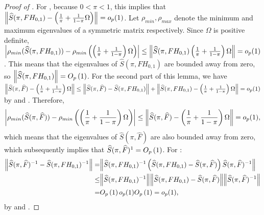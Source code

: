 \documentclass[12pt]{article}
\theoremstyle{plain}
\numberwithin{equation}{section}
\begin{document}
\begin{proof}[Proof of ]
For , because $0 \lt \pi \lt 1$, this implies that \\ $\norm{\widehat{S}(\pi, F H_{0, 1}) - \left( \frac{1}{\pi} + \frac{1}{1 - \pi} \Omega \right) } = o_p(1)$. Let $\rho_{min}, \rho_{max}$ denote the minimum and maximum eigenvalues of a symmetric matrix respectively. Since $\Omega$ is positive definite, \\
$\abs{\rho_{min}(\widehat{S}(\pi, FH_{0, 1})) - \rho_{min} \left( \left( \frac{1}{\pi} + \frac{1}{1 - \pi} \right) \Omega \right)} \leq \norm{\widehat{S}(\pi, F H_{0,1}) \left( \frac{1}{\pi} + \frac{1}{1 - \pi} \right) \Omega } = o_p(1)$. This means that the eigenvalues of $\widehat{S}(\pi, F H_{0, 1})$ are bounded away from zero, so $\norm{\widehat{S}(\pi, F H_{0, 1})} = O_p \left( 1 \right)$. For the second part of this lemma, we have \\
$\norm{\widehat{S}(\pi, \widehat{F}) - \left( \frac{1}{\pi} + \frac{1}{1 - \pi} \right)\Omega } \leq \norm{\widehat{S}(\pi, \widehat{F}) - \widehat{S}(\pi, F H_{0, 1})} + \norm{\widehat{S}(\pi, F H_{0, 1}) - \left( \frac{1}{\pi} + \frac{1}{1 - \pi} \right) \Omega} = o_p(1)$ by  and . Therefore, 
\begin{align*}
\abs{
	\rho_{min}(\widehat{S}(\pi, \widehat{F})) 
	- \rho_{min} \left( \left( \frac{1}{\pi} + \frac{1}{1 - \pi} \right) \Omega \right)
}
\leq 
\norm{
	\widehat{S}(\pi, \widehat{F}) - \left( \frac{1}{\pi} + \frac{1}{1 - \pi} \right) \Omega
	} 
= o_p(1),
\end{align*}
which means that the eigenvalues of $\widehat{S}(\pi, \widehat{F})$ are also bounded away from zero, which subsequently implies that $\widehat{S}(\pi, \widehat{F})^{1} = O_p \left( 1 \right)$.
For :
\begin{align*}
\norm{
	\widehat{S}(\pi, \widehat{F})^{-1} - \widehat{S}(\pi, FH_{0, 1})^{-1}
} 
= &\norm{
	\widehat{S}(\pi, F H_{0, 1})^{-1} 
	\left( \widehat{S}(\pi, F H_{0, 1}) - \widehat{S}(\pi, \widehat{F}) \right)
	\widehat{S}(\pi, \widehat{F})^{-1}
} \\
\leq 
&\norm{\widehat{S}(\pi, F H_{0, 1})^{-1}} 
\norm{\widehat{S}(\pi, F H_{0, 1}) - \widehat{S}(\pi, \widehat{F})} 
\norm{\widehat{S}(\pi, \widehat{F})^{-1}} \\
= &O_p \left( 1 \right)o_p(1)O_p \left( 1 \right) = o_p(1),
\end{align*}
by  and .
\end{proof}
\end{document}
